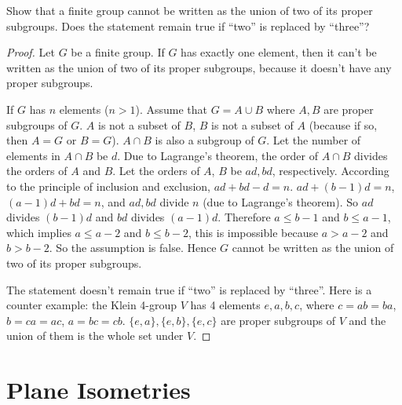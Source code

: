 \begin{exercise}
    Show that a finite group cannot be written as the union of two of its proper subgroups. Does the statement remain true if ``two'' is replaced by ``three''?
\end{exercise}

\begin{proof}
    Let $G$ be a finite group. If $G$ has exactly one element, then it can't be written as the union of two of its proper subgroups, because it doesn't have any proper subgroups.

    If $G$ has $n$ elements ($n > 1$). Assume that $G = A\cup B$ where $A, B$ are proper subgroups of $G$. $A$ is not a subset of $B$, $B$ is not a subset of $A$ (because if so, then $A = G$ or $B = G$). $A\cap B$ is also a subgroup of $G$. Let the number of elements in $A\cap B$ be $d$. Due to Lagrange's theorem, the order of $A\cap B$ divides the orders of $A$ and $B$. Let the orders of $A$, $B$ be $ad, bd$, respectively. According to the principle of inclusion and exclusion, $ad + bd - d = n$. $ad + (b-1)d = n$, $(a-1)d + bd = n$, and $ad, bd$ divide $n$ (due to Lagrange's theorem). So $ad$ divides $(b - 1)d$ and $bd$ divides $(a - 1)d$. Therefore $a\leq b - 1$ and $b\leq a - 1$, which implies $a\leq a - 2$ and $b\leq b - 2$, this is impossible because $a > a - 2$ and $b > b - 2$. So the assumption is false. Hence $G$ cannot be written as the union of two of its proper subgroups.

    The statement doesn't remain true if ``two'' is replaced by ``three''. Here is a counter example: the Klein 4-group $V$ has 4 elements $e, a, b, c$, where $c = ab = ba$, $b = ca = ac$, $a = bc = cb$. $\{e, a\}, \{e, b\}, \{e, c\}$ are proper subgroups of $V$ and the union of them is the whole set under $V$.
\end{proof}

\section{Plane Isometries}
